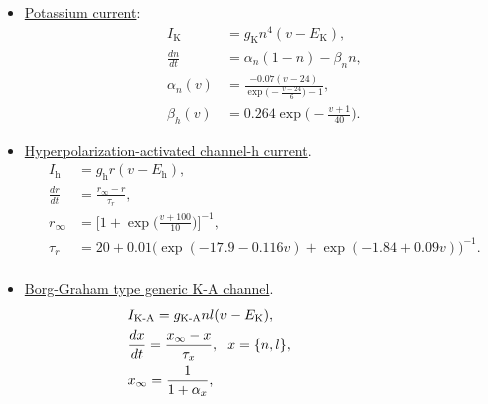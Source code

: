 \documentclass[../main.tex]{subfiles}
\begin{document}
\begin{itemize}
    \item \underline{Potassium current}: 
        \begin{equation}
        \begin{aligned}
            I_\text{K} &= g_\text{K}n^4(v-E_\text{K}),\\
            \displaystyle\frac{dn}{dt} &= \alpha_n(1-n)-\beta_nn,\\
            \alpha_n(v) &= \displaystyle\frac{-0.07(v-24)}{\exp{\Big(-\frac{v-24}{6}\Big)}-1}, \\ %
            \beta_h(v) & = 0.264\exp{\bigg(-\displaystyle\frac{v+1}{40}\bigg)}.
            \label{eq:cck-potassium-current}
        \end{aligned}
        \end{equation}
    \item \underline{Hyperpolarization-activated channel-h current}. 
        \begin{equation}
        \begin{aligned}
            I_{\text{h}} &= g_{\text{h}}r(v-E_{\text{h}}),\\
            \displaystyle\frac{dr}{dt} &= \displaystyle\frac{r_\infty-r}{\tau_r}, \\
            r_\infty &= \Bigg[ 1+\exp{ \bigg( \displaystyle\frac{v+100}{10} \bigg) }\Bigg]^{-1},\\
            \tau_r &= 20 + 0.01\bigg(\exp{(-17.9-0.116v)} + \exp{(-1.84+0.09v)} \bigg)^{-1}.\\
            \label{eq:cck-hyperpolarization-current}
        \end{aligned}
        \end{equation}
    \clearpage
    \item \underline{Borg-Graham type generic K-A channel}.
        \begin{equation}
        \begin{aligned}
            &\hspace{-2.8cm}I_{\text{K-A}} = g_{\text{K-A}}nl(v-E_{\text{K}}), \\
            &\hspace{-2.8cm}\displaystyle\frac{dx}{dt} = \displaystyle\frac{x_{\infty}-x}{\tau_x}, \hspace{0.2cm} x = \{n,l\},\\
            &\hspace{-2.8cm}x_\infty = \displaystyle\frac{1}{1+\alpha_x},\\%

\end{aligned}
\end{equation}
\end{itemize}
\end{document}
